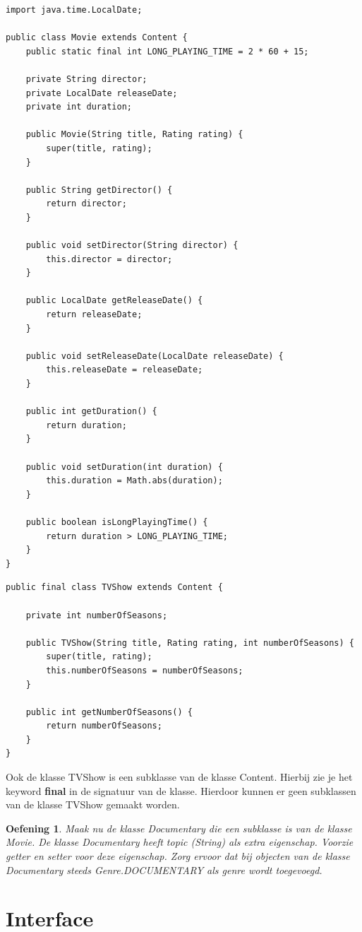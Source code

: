 \documentclass{tstextbook}
\newtheorem{envoefening}{Oefening}[chapter]
\newenvironment{oefening}
               {\begin{boxexercise}\begin{envoefening}}
               {\end{envoefening}\end{boxexercise}}
\begin{document}
\begin{lstlisting}
import java.time.LocalDate;

public class Movie extends Content {
	public static final int LONG_PLAYING_TIME = 2 * 60 + 15;

	private String director;
	private LocalDate releaseDate;
	private int duration;

	public Movie(String title, Rating rating) {
		super(title, rating);
	}

	public String getDirector() {
		return director;
	}

	public void setDirector(String director) {
		this.director = director;
	}

	public LocalDate getReleaseDate() {
		return releaseDate;
	}

	public void setReleaseDate(LocalDate releaseDate) {
		this.releaseDate = releaseDate;
	}

	public int getDuration() {
		return duration;
	}

	public void setDuration(int duration) {
		this.duration = Math.abs(duration);
	}

	public boolean isLongPlayingTime() {
		return duration > LONG_PLAYING_TIME;
	}
}
\end{lstlisting}

\begin{lstlisting}
public final class TVShow extends Content {

	private int numberOfSeasons;

	public TVShow(String title, Rating rating, int numberOfSeasons) {
		super(title, rating);
		this.numberOfSeasons = numberOfSeasons;
	}

	public int getNumberOfSeasons() {
		return numberOfSeasons;
	}
}
\end{lstlisting}

Ook de klasse TVShow is een subklasse van de klasse Content. Hierbij zie je het keyword \textbf{final} in de signatuur van de klasse. Hierdoor kunnen er geen subklassen van de klasse TVShow gemaakt worden.

\begin{oefening}
Maak nu de klasse Documentary die een subklasse is van de klasse Movie. De klasse Documentary heeft topic (String) als extra eigenschap.  Voorzie getter en setter voor deze eigenschap.  Zorg ervoor dat bij objecten van de klasse Documentary steeds Genre.DOCUMENTARY als genre wordt toegevoegd.
\end{oefening}

\section{Interface}
\end{document}

